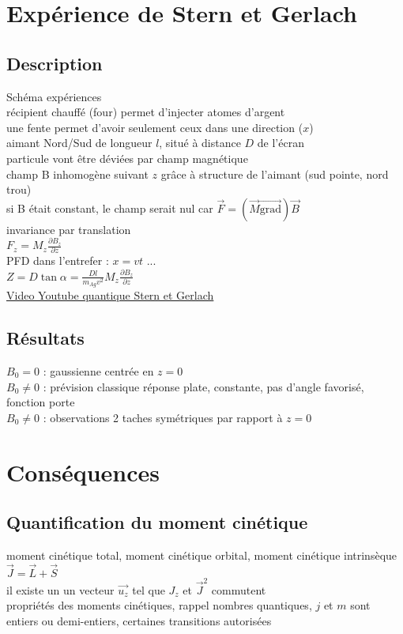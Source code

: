 \section{Expérience de Stern et Gerlach}
\subsection{Description}
Schéma expériences \\
récipient chauffé (four) permet d'injecter atomes d'argent \\
une fente permet d'avoir seulement ceux dans une direction ($x$) \\
aimant Nord/Sud de longueur $l$, situé à distance $D$ de l'écran \\
particule vont être déviées par champ magnétique \\
champ B inhomogène suivant $z$ grâce à structure de l'aimant (sud pointe, nord trou) \\
si B était constant, le champ serait nul car $\vec{F}=\left( \vec{M} \vec{\mathrm{grad}} \right) \vec{B}$ \\
invariance par translation  \\
$F_z=M_z \frac{\partial B_z}{\partial z}$ \\
PFD dans l'entrefer : $x=v t$ ... \\
$Z=D \tan \alpha =\frac{D l}{ m_{Ag} v^2} M_z \frac{\partial B_z}{\partial z} $   \\

\href{https://youtu.be/8wS4IOzAhFA}{Video Youtube quantique Stern et Gerlach}

\subsection{Résultats}
$B_0=0$ : gaussienne centrée en $z=0$ \\
$B_0 \neq 0$ : prévision classique réponse plate, constante, pas d'angle favorisé, fonction porte \\
$B_0 \neq 0$ : observations 2 taches symétriques par rapport à $z=0$ \\


\section{Conséquences}
\subsection{Quantification du moment cinétique} 
moment cinétique total, moment cinétique orbital, moment cinétique intrinsèque \\
$\vec{J}=\vec{L}+\vec{S}$ \\
il existe un un vecteur $\vec{u_z}$ tel que $J_z$ et $\vec{J}^2$ commutent \\
propriétés des moments cinétiques, rappel nombres quantiques, $j$ et $m$ sont entiers ou demi-entiers, certaines transitions autorisées \\

